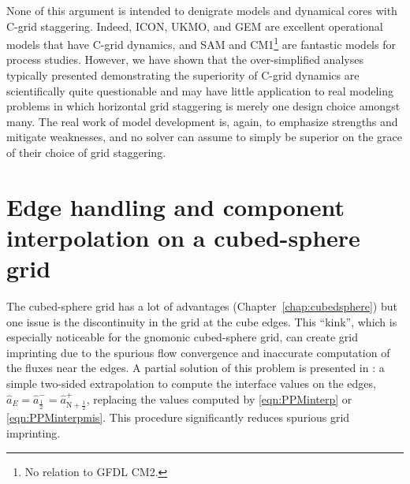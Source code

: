 \documentclass[10pt,letterpaper,margin=1in]{memoir}
\newcommand{\half}{\frac{1}{2}}
\begin{document}
None of this argument is intended to denigrate models and dynamical cores with C-grid staggering. Indeed, ICON, UKMO, and GEM are excellent operational models that have C-grid dynamics, and SAM and CM1\footnote{No relation to GFDL CM2.} are fantastic models for process studies. However, we have shown that the over-simplified analyses typically presented demonstrating the superiority of C-grid dynamics are scientifically quite questionable and may have little application to real modeling problems in which horizontal grid staggering is merely one design choice amongst many. The real work of model development is, again, to emphasize strengths and mitigate weaknesses, and no solver can assume to simply be superior on the grace of their choice of grid staggering.



\section{Edge handling and component interpolation on a cubed-sphere grid}\label{sec:edgehandling}

The cubed-sphere grid has a lot of advantages (Chapter~\ref{chap:cubedsphere}) but one issue is the discontinuity in the grid at the cube edges. This ``kink'', which is especially noticeable for the gnomonic cubed-sphere grid, can create grid imprinting due to the spurious flow convergence and inaccurate computation of the fluxes near the edges. A partial solution of this problem is presented in \citet{PL07}: a simple two-sided extrapolation to compute the interface values on the edges, $\widehat{a}_E = \widehat{a}^{-}_\half = \widehat{a}^+_{\text{N}+\half}$, replacing the values computed by \eqref{eqn:PPMinterp} or \eqref{eqn:PPMinterpmis}. This procedure significantly reduces spurious grid imprinting.

\end{document}
